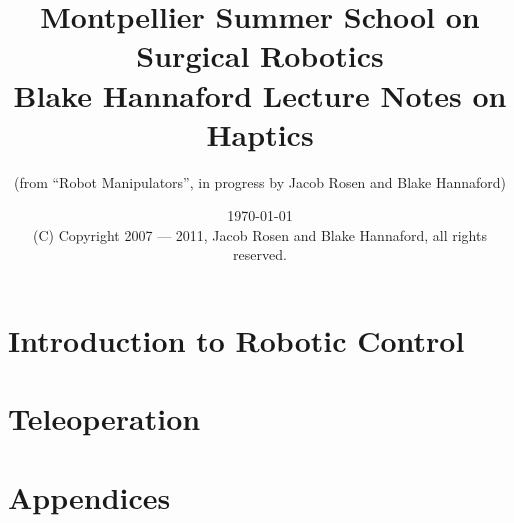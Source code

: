 \documentclass[letterpaper]{book}
\begin{document}
\frontmatter

\title{Montpellier Summer School on Surgical Robotics\\Blake Hannaford Lecture Notes on Haptics}\author{(from ``Robot Manipulators'', in progress by Jacob Rosen and Blake Hannaford)}

\date{\today\\(C) Copyright 2007 --- 2011, Jacob Rosen and Blake Hannaford, all rights reserved. }

\maketitle

\tableofcontents

\mainmatter

 \part{Introduction to Robotic Control}

  \part{Teleoperation}
% 
 \part{Appendices}
 \appendix
% 
 

\backmatter
%
\label{LastPage}
\end{document}
